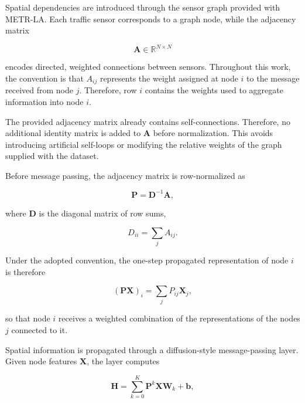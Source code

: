 Spatial dependencies are introduced through the sensor graph provided with
METR-LA. Each traffic sensor corresponds to a graph node, while the adjacency
matrix

\begin{equation}
    \mathbf{A} \in \mathbb{R}^{N \times N}
\end{equation}

encodes directed, weighted connections between sensors. Throughout this work,
the convention is that $A_{ij}$ represents the weight assigned at node $i$
to the message received from node $j$. Therefore, row $i$ contains the
weights used to aggregate information into node $i$.

The provided adjacency matrix already contains self-connections. Therefore,
no additional identity matrix is added to $\mathbf{A}$ before normalization.
This avoids introducing artificial self-loops or modifying the relative
weights of the graph supplied with the dataset.

Before message passing, the adjacency matrix is row-normalized as

\begin{equation}
    \mathbf{P} = \mathbf{D}^{-1}\mathbf{A},
    \label{eq:row_normalization}
\end{equation}

where $\mathbf{D}$ is the diagonal matrix of row sums,

\begin{equation}
    D_{ii} = \sum_j A_{ij}.
\end{equation}

Under the adopted convention, the one-step propagated representation of node
$i$ is therefore

\begin{equation}
    (\mathbf{P}\mathbf{X})_i
    =
    \sum_j P_{ij}\mathbf{X}_j,
    \label{eq:graph_aggregation}
\end{equation}

so that node $i$ receives a weighted combination of the representations of
the nodes $j$ connected to it.

Spatial information is propagated through a diffusion-style message-passing
layer. Given node features $\mathbf{X}$, the layer computes

\begin{equation}
    \mathbf{H}
    =
    \sum_{k=0}^{K}
    \mathbf{P}^{k}\mathbf{X}\mathbf{W}_{k}
    +
    \mathbf{b},
    \label{eq:diffusion}
\end{equation}

